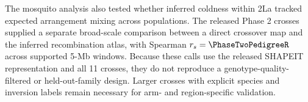 The mosquito analysis also tested whether inferred coldness within 2La tracked expected arrangement mixing across populations. The released Phase 2 crosses supplied a separate broad-scale comparison between a direct crossover map and the inferred recombination atlas, with Spearman \(r_s=\PhaseTwoPedigreeR\) across \PhaseTwoPedigreeWindowCount{} supported 5-Mb windows. Because these calls use the released SHAPEIT representation and all 11 crosses, they do not reproduce a genotype-quality-filtered or held-out-family design. Larger crosses with explicit species and inversion labels remain necessary for arm- and region-specific validation.
